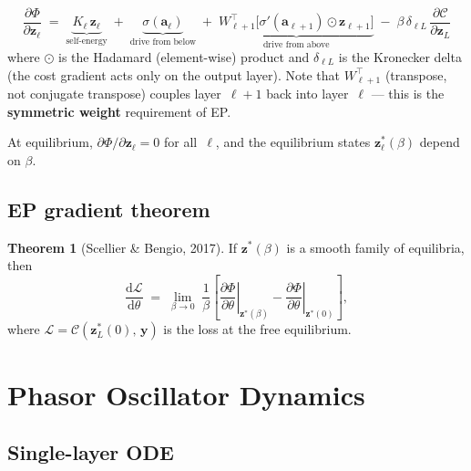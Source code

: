 \documentclass[11pt]{article}
\newcommand{\dd}{\mathrm{d}}
\theoremstyle{definition}
\newtheorem{theorem}{Theorem}
\begin{document}
\begin{equation}\label{eq:ep-grad}
  \boxed{
  \frac{\partial\Phi}{\partial\bm{z}_\ell}
  \;=\;
  \underbrace{K_\ell\,\bm{z}_\ell}_{\text{self-energy}}
  \;+\;
  \underbrace{\sigma(\bm{a}_\ell)}_{\text{drive from below}}
  \;+\;
  \underbrace{
    W_{\ell+1}^{\!\top}\!
    \bigl[
      \sigma'(\bm{a}_{\ell+1})\odot\bm{z}_{\ell+1}
    \bigr]
  }_{\text{drive from above}}
  \;-\;
  \beta\,\delta_{\ell L}\,
  \frac{\partial\mathcal{C}}{\partial\bm{z}_L}
  }
\end{equation}
where $\odot$ is the Hadamard (element-wise) product and
$\delta_{\ell L}$ is the Kronecker delta (the cost gradient acts only
on the output layer).  Note that $W_{\ell+1}^{\!\top}$ (transpose,
not conjugate transpose) couples layer~$\ell+1$ back into
layer~$\ell$ --- this is the \textbf{symmetric weight} requirement of EP.

At equilibrium, $\partial\Phi/\partial\bm{z}_\ell=0$ for all~$\ell$,
and the equilibrium states $\bm{z}_\ell^*(\beta)$ depend on $\beta$.

\subsection{EP gradient theorem}

\begin{theorem}[Scellier \& Bengio, 2017]
If $\bm{z}^*(\beta)$ is a smooth family of equilibria, then
\begin{equation}\label{eq:ep-grad-thm}
  \frac{\dd\mathcal{L}}{\dd\theta}
  \;=\;
  \lim_{\beta\to 0}\;
  \frac{1}{\beta}
  \left[
    \left.\frac{\partial\Phi}{\partial\theta}\right|_{\bm{z}^*(\beta)}
    -
    \left.\frac{\partial\Phi}{\partial\theta}\right|_{\bm{z}^*(0)}
  \right],
\end{equation}
where $\mathcal{L}=\mathcal{C}(\bm{z}_L^*(0),\,\bm{y})$ is the loss
at the free equilibrium.
\end{theorem}

\section{Phasor Oscillator Dynamics}\label{sec:phasor}

\subsection{Single-layer ODE}
\end{document}
